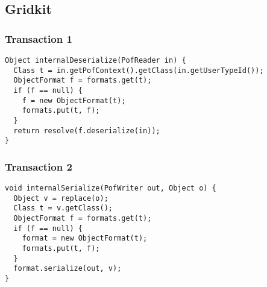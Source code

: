 %
%
%
%

\subsection{Gridkit}
\subsubsection*{Transaction 1}
\begin{lstlisting}
Object internalDeserialize(PofReader in) {
  Class t = in.getPofContext().getClass(in.getUserTypeId());
  ObjectFormat f = formats.get(t);
  if (f == null) {
    f = new ObjectFormat(t);
    formats.put(t, f);
  }
  return resolve(f.deserialize(in));
}
\end{lstlisting}

%
%
%
%

\subsubsection*{Transaction 2}
\begin{lstlisting}
void internalSerialize(PofWriter out, Object o) {
  Object v = replace(o);
  Class t = v.getClass();
  ObjectFormat f = formats.get(t);
  if (f == null) {
    format = new ObjectFormat(t);
    formats.put(t, f);
  }
  format.serialize(out, v);
}
\end{lstlisting}


%
%
%
